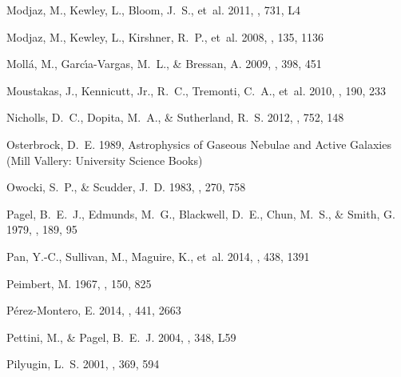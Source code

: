 \documentclass{emulateapj} \usepackage{amsmath} \usepackage{float}
\begin{document}
\begin{thebibliography}{}
{Modjaz}, M., {Kewley}, L., {Bloom}, J.~S., {et~al.} 2011, \apjl, 731, L4

{Modjaz}, M., {Kewley}, L., {Kirshner}, R.~P., {et~al.} 2008, \aj, 135, 1136

{Moll{\'a}}, M., {Garc{\'{\i}}a-Vargas}, M.~L., \& {Bressan}, A. 2009, \mnras,
  398, 451

{Moustakas}, J., {Kennicutt}, Jr., R.~C., {Tremonti}, C.~A., {et~al.} 2010,
  \apjs, 190, 233

{Nicholls}, D.~C., {Dopita}, M.~A., \& {Sutherland}, R.~S. 2012, \apj, 752, 148

{Osterbrock}, D.~E. 1989, {Astrophysics of Gaseous Nebulae and Active Galaxies}
  (Mill Vallery: University Science Books)

{Owocki}, S.~P., \& {Scudder}, J.~D. 1983, \apj, 270, 758

{Pagel}, B.~E.~J., {Edmunds}, M.~G., {Blackwell}, D.~E., {Chun}, M.~S., \&
  {Smith}, G. 1979, \mnras, 189, 95

{Pan}, Y.-C., {Sullivan}, M., {Maguire}, K., {et~al.} 2014, \mnras, 438, 1391

{Peimbert}, M. 1967, \apj, 150, 825

{P{\'e}rez-Montero}, E. 2014, \mnras, 441, 2663

{Pettini}, M., \& {Pagel}, B.~E.~J. 2004, \mnras, 348, L59

{Pilyugin}, L.~S. 2001, \aap, 369, 594


\end{thebibliography}
\end{document}
